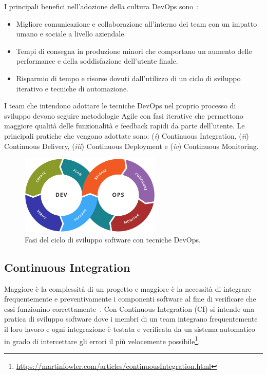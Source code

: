I principali benefici nell'adozione della cultura DevOps sono~\cite{krief2019learning}:
\begin{itemize}
    \item Migliore comunicazione e collaborazione all'interno dei team con un impatto umano e sociale a livello aziendale.
    \item Tempi di consegna in produzione minori che comportano un aumento delle performance e della soddisfazione dell'utente finale.
    \item Risparmio di tempo e risorse dovuti dall'utilizzo di un ciclo di sviluppo iterativo e tecniche di automazione.
\end{itemize}

I team che intendono adottare le tecniche DevOps nel proprio processo di sviluppo devono seguire metodologie Agile con fasi iterative che permettono maggiore qualità delle funzionalità e feedback rapidi da parte dell'utente. Le principali pratiche che vengono adottate sono: (\textit{i}) Continuous Integration, (\textit{ii}) Continuous Delivery, (\textit{iii}) Continuous Deployment e (\textit{iv}) Continuous Monitoring.

\begin{figure}[H]
    \centering
    \includegraphics[width=0.6\textwidth]{img/Devops-toolchain.png}
    \caption{Fasi del ciclo di sviluppo software con tecniche DevOps.}
\end{figure}

\subsection{Continuous Integration}
\label{ci-sec}
Maggiore è la complessità di un progetto e maggiore è la necessità di integrare frequentemente e preventivamente i componenti software al fine di verificare che essi funzionino correttamente~\cite{duvall2007continuous}. Con Continuous Integration (CI) si intende una pratica di sviluppo software dove i membri di un team integrano frequentemente il loro lavoro e ogni integrazione è testata e verificata da un sistema automatico in grado di intercettare gli errori il più velocemente possibile\footnote{\href{https://martinfowler.com/articles/continuousIntegration.html}{https://martinfowler.com/articles/continuousIntegration.html}}.

